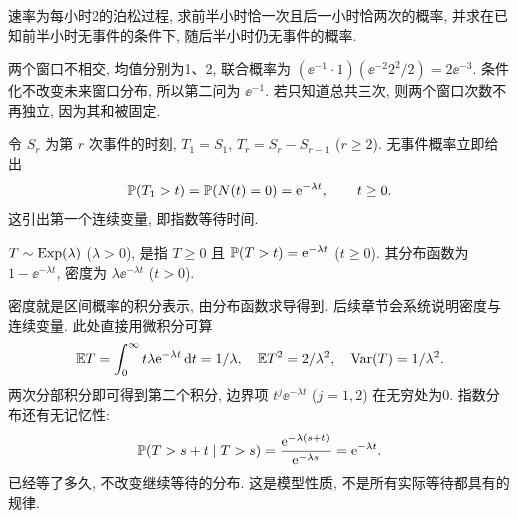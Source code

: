 \begin{example}
速率为每小时2的泊松过程, 求前半小时恰一次且后一小时恰两次的概率, 并求在已知前半小时无事件的条件下, 随后半小时仍无事件的概率.
\end{example}
\begin{solution}
两个窗口不相交, 均值分别为1、2, 联合概率为
$(\ee^{-1}\cdot1)(\ee^{-2}2^2/2)=2\ee^{-3}$.
条件化不改变未来窗口分布, 所以第二问为 $\ee^{-1}$. 若只知道总共三次, 则两个窗口次数不再独立, 因为其和被固定.
\end{solution}

令 $S_r$ 为第 $r$ 次事件的时刻, $T_1=S_1$, $T_r=S_r-S_{r-1}$ ($r\ge2$). 无事件概率立即给出
\[
\mathbb P(T_1>t)=\mathbb P(N(t)=0)=\mathrm e^{-\lambda t},\qquad t\ge0.
\]
这引出第一个连续变量, 即指数等待时间.
\begin{definition}
$T\sim\operatorname{Exp}(\lambda)$ ($\lambda>0$), 是指 $T\ge0$ 且 $\mathbb P(T>t)=\mathrm e^{-\lambda t}$ ($t\ge0$). 其分布函数为 $1-\ee^{-\lambda t}$, 密度为 $\lambda\ee^{-\lambda t}$ ($t>0$).
\end{definition}
密度就是区间概率的积分表示, 由分布函数求导得到. 后续章节会系统说明密度与连续变量. 此处直接用微积分可算
\[
\mathbb E T=\int_0^\infty t\lambda\mathrm e^{-\lambda t}\,\mathrm d t=1/\lambda,
\quad \mathbb E T^2=2/\lambda^2,\quad\operatorname{Var}(T)=1/\lambda^2.
\]
两次分部积分即可得到第二个积分, 边界项 $t^j\ee^{-\lambda t}$ ($j=1,2$) 在无穷处为0. 指数分布还有无记忆性:
\[
\mathbb P(T>s+t\mid T>s)=\frac{\mathrm e^{-\lambda(s+t)}}{\mathrm e^{-\lambda s}}=\mathrm e^{-\lambda t}.
\]
已经等了多久, 不改变继续等待的分布. 这是模型性质, 不是所有实际等待都具有的规律.

